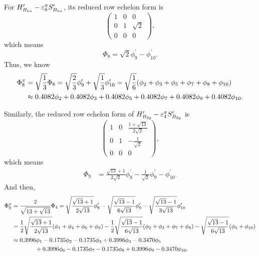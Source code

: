 		For $H^\prime_{B_{1u}}-\varepsilon^\pi_8 S^\prime_{B_{1u}}$, its reduced row echelon form is
		\begin{equation*}
			\begin{pmatrix}
				1	& 0	&	0	\\	0	&	1	&	\sqrt{2}	\\	0	&	0	&	0
			\end{pmatrix},
		\end{equation*}
		which means
		\begin{equation*}
			\Phi_8 = \sqrt{2}\phi^\prime_9 - \phi^\prime_{10}.
		\end{equation*}
		Thus, we know
		\begin{align}
			\Phi^\pi_8 &= \sqrt{\frac{1}{3}}\Phi_8 = \sqrt{\frac{2}{3}} \phi^\prime_9 + \sqrt{\frac{1}{3}} \phi^\prime_{10} = \sqrt{\frac{1}{6}} (\phi_2 + \phi_3 + \phi_5 + \phi_7 + \phi_8 + \phi_{10})  \notag \\
			&\approx 0.4082 \phi_2 + 0.4082 \phi_3 + 0.4082 \phi_5 +  0.4082\phi_7 + 0.4082 \phi_8 + 0.4082 \phi_{10}.
		\end{align}
		
		Similarly, the reduced row echelon form of $H^\prime_{B_{3g}}-\varepsilon^\pi_4 S^\prime_{B_{3g}}$ is
		\begin{equation*}
			\begin{pmatrix}
				1	& 0	&	\frac{1+\sqrt{13}}{2\sqrt{2}}	\\	0	&	1	&	-\frac{1}{\sqrt{2}}	\\	0	&	0	&	0
			\end{pmatrix},
		\end{equation*}		
		which means
		\begin{align*}
			\Phi_9 &= \frac{\sqrt{13}+1}{2\sqrt{2}}\phi^\prime_8 - \frac{1}{\sqrt{2}} \phi^\prime_9 - \phi^\prime_{10}.
		\end{align*}
		And then,
		\begin{align}
			\Phi^\pi_9 &= \frac{2}{\sqrt{13+\sqrt{13}}} \Phi_4 = \sqrt{\frac{\sqrt{13}+1}{2\sqrt{13}}} \phi^\prime_8 - \sqrt{\frac{\sqrt{13}-1}{6\sqrt{13}}} \phi^\prime_9	- \sqrt{\frac{\sqrt{13}-1}{3\sqrt{13}}} \phi^\prime_{10}\notag \\
			&= \frac{1}{2}\sqrt{\frac{\sqrt{13}+1}{2\sqrt{13}}}(\phi_1 + \phi_4 + \phi_6 + \phi_9) - \frac{1}{2}\sqrt{\frac{\sqrt{13}-1}{6\sqrt{13}}} (\phi_2 + \phi_3 + \phi_7 + \phi_8) - \sqrt{\frac{\sqrt{13}-1}{6\sqrt{13}}} (\phi_5 +\phi_{10})  \notag \\
			&\approx 0.3996 \phi_1 - 0.1735 \phi_2 -0.1735 \phi_3 +0.3996 \phi_4 -0.3470 \phi_5 \notag \\
			&\hspace*{4em} + 0.3996\phi_6 -0.1735 \phi_7 - 0.1735 \phi_8 + 0.3996 \phi_9 - 0.3470 \phi_{10}.
		\end{align}
		
